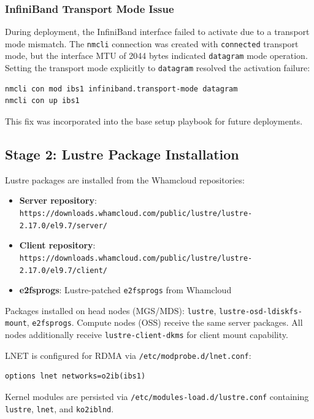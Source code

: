 \subsubsection{InfiniBand Transport Mode Issue}

During deployment, the InfiniBand interface failed to activate due to a transport mode mismatch. The \texttt{nmcli} connection was created with \texttt{connected} transport mode, but the interface MTU of 2044 bytes indicated \texttt{datagram} mode operation. Setting the transport mode explicitly to \texttt{datagram} resolved the activation failure:

\begin{verbatim}
nmcli con mod ibs1 infiniband.transport-mode datagram
nmcli con up ibs1
\end{verbatim}

This fix was incorporated into the base setup playbook for future deployments.

\subsection{Stage 2: Lustre Package Installation}

Lustre packages are installed from the Whamcloud repositories:

\begin{itemize}
    \item \textbf{Server repository}: \texttt{https://downloads.whamcloud.com/public/lustre/lustre-2.17.0/el9.7/server/}
    \item \textbf{Client repository}: \texttt{https://downloads.whamcloud.com/public/lustre/lustre-2.17.0/el9.7/client/}
    \item \textbf{e2fsprogs}: Lustre-patched \texttt{e2fsprogs} from Whamcloud
\end{itemize}

Packages installed on head nodes (MGS/MDS): \texttt{lustre}, \texttt{lustre-osd-ldiskfs-mount}, \texttt{e2fsprogs}. Compute nodes (OSS) receive the same server packages. All nodes additionally receive \texttt{lustre-client-dkms} for client mount capability.

LNET is configured for RDMA via \texttt{/etc/modprobe.d/lnet.conf}:

\begin{verbatim}
options lnet networks=o2ib(ibs1)
\end{verbatim}

Kernel modules are persisted via \texttt{/etc/modules-load.d/lustre.conf} containing \texttt{lustre}, \texttt{lnet}, and \texttt{ko2iblnd}.

